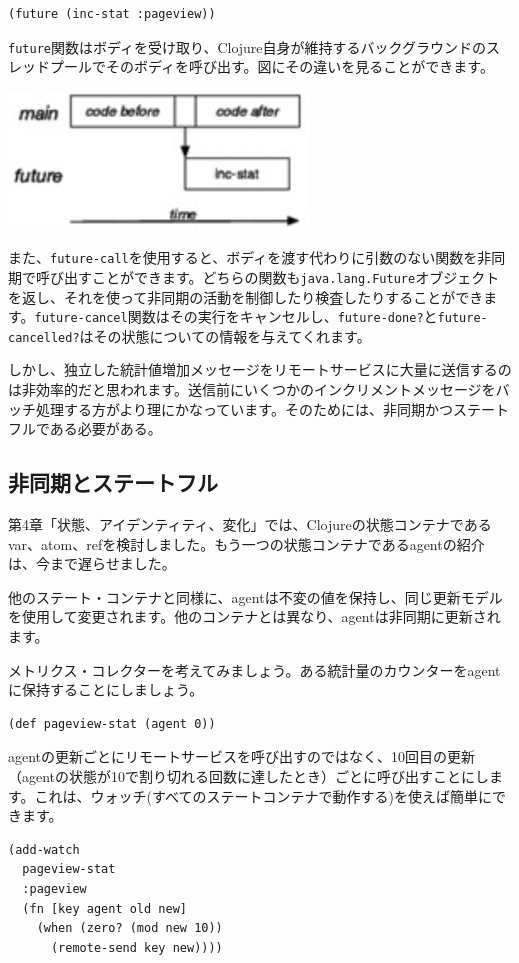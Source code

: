 \begin{lstlisting}[numbers=none]
(future (inc-stat :pageview))
\end{lstlisting}

\texttt{future}関数はボディを受け取り、Clojure自身が維持するバックグラウンドのスレッドプールでそのボディを呼び出す。図にその違いを見ることができます。

\includegraphics[width=8cm]{fig_05_002.eps}

また、\texttt{future-call}を使用すると、ボディを渡す代わりに引数のない関数を非同期で呼び出すことができます。どちらの関数も\texttt{java.lang.Future}オブジェクトを返し、それを使って非同期の活動を制御したり検査したりすることができます。\texttt{future-cancel}関数はその実行をキャンセルし、\texttt{future-done?}と\texttt{future-cancelled?}はその状態についての情報を与えてくれます。

しかし、独立した統計値増加メッセージをリモートサービスに大量に送信するのは非効率的だと思われます。送信前にいくつかのインクリメントメッセージをバッチ処理する方がより理にかなっています。そのためには、非同期かつステートフルである必要がある。


\subsection{非同期とステートフル}

第4章「状態、アイデンティティ、変化」では、Clojureの状態コンテナであるvar、atom、refを検討しました。もう一つの状態コンテナであるagentの紹介は、今まで遅らせました。

他のステート・コンテナと同様に、agentは不変の値を保持し、同じ更新モデルを使用して変更されます。他のコンテナとは異なり、agentは非同期に更新されます。

メトリクス・コレクターを考えてみましょう。ある統計量のカウンターをagentに保持することにしましょう。

\begin{lstlisting}[numbers=none]
(def pageview-stat (agent 0))
\end{lstlisting}

agentの更新ごとにリモートサービスを呼び出すのではなく、10回目の更新（agentの状態が10で割り切れる回数に達したとき）ごとに呼び出すことにします。これは、ウォッチ(すべてのステートコンテナで動作する)を使えば簡単にできます。


\begin{lstlisting}[numbers=none]
(add-watch
  pageview-stat
  :pageview
  (fn [key agent old new]
    (when (zero? (mod new 10))
      (remote-send key new))))
\end{lstlisting}







